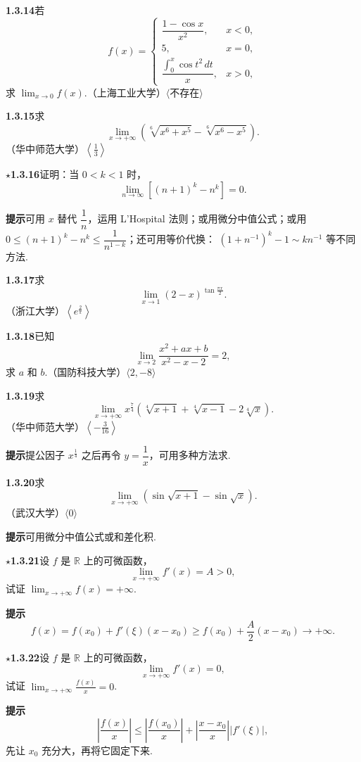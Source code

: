 \documentclass[UTF8, 12pt, fontset=fandol, oneside]{ctexart}
\begin{document}
\noindent\textbf{1.3.14}\quad 若
\[
  f(x)=
  \begin{cases}
    \dfrac{1-\cos x}{x^2}, & x<0,\\[6pt]
    5, & x=0,\\[6pt]
    \dfrac{\int_0^x\cos t^2\,dt}{x}, & x>0,
  \end{cases}
\]
求 $\displaystyle\lim_{x\to0}f(x)$.（上海工业大学）\quad $\langle\text{不存在}\rangle$

\noindent\textbf{1.3.15}\quad 求
\[
  \lim_{x\to+\infty}\left(\sqrt[6]{x^6+x^5}-\sqrt[6]{x^6-x^5}\right).
\]
（华中师范大学）\quad $\left\langle\frac13\right\rangle$

\noindent\textbf{$\star$1.3.16}\quad 证明：当 $0<k<1$ 时，
\[
  \lim_{n\to\infty}[(n+1)^k-n^k]=0.
\]

\noindent\textbf{提示}\quad 可用 $x$ 替代 $\dfrac1n$，运用 L'Hospital 法则；或用微分中值公式；或用
$0\le(n+1)^k-n^k\le\dfrac1{n^{1-k}}$；还可用等价代换：
$(1+n^{-1})^k-1\sim kn^{-1}$ 等不同方法.

\noindent\textbf{1.3.17}\quad 求
\[
  \lim_{x\to1}(2-x)^{\tan\frac{\pi x}{2}}.
\]
（浙江大学）\quad $\left\langle e^{\frac2\pi}\right\rangle$

\noindent\textbf{1.3.18}\quad 已知
\[
  \lim_{x\to2}\frac{x^2+ax+b}{x^2-x-2}=2,
\]
求 $a$ 和 $b$.（国防科技大学）\quad $\langle2,-8\rangle$

\noindent\textbf{1.3.19}\quad 求
\[
  \lim_{x\to+\infty}x^{\frac74}\left(\sqrt[4]{x+1}+\sqrt[4]{x-1}-2\sqrt[4]{x}\right).
\]
（华中师范大学）\quad $\left\langle-\frac3{16}\right\rangle$

\noindent\textbf{提示}\quad 提公因子 $x^{\frac14}$ 之后再令 $y=\dfrac1x$，可用多种方法求.

\noindent\textbf{1.3.20}\quad 求
\[
  \lim_{x\to+\infty}(\sin\sqrt{x+1}-\sin\sqrt{x}).
\]
（武汉大学）\quad $\langle0\rangle$

\noindent\textbf{提示}\quad 可用微分中值公式或和差化积.

\noindent\textbf{$\star$1.3.21}\quad 设 $f$ 是 $\mathbb R$ 上的可微函数，
\[
  \lim_{x\to+\infty}f'(x)=A>0,
\]
试证 $\displaystyle\lim_{x\to+\infty}f(x)=+\infty$.

\noindent\textbf{提示}\quad
\[
  f(x)=f(x_0)+f'(\xi)(x-x_0)\ge f(x_0)+\frac A2(x-x_0)\to+\infty.
\]

\noindent\textbf{$\star$1.3.22}\quad 设 $f$ 是 $\mathbb R$ 上的可微函数，
\[
  \lim_{x\to+\infty}f'(x)=0,
\]
试证 $\displaystyle\lim_{x\to+\infty}\frac{f(x)}x=0$.

\noindent\textbf{提示}\quad
\[
  \left|\frac{f(x)}x\right|\le
  \left|\frac{f(x_0)}x\right|+
  \left|\frac{x-x_0}{x}\right||f'(\xi)|,
\]
先让 $x_0$ 充分大，再将它固定下来.
\end{document}

